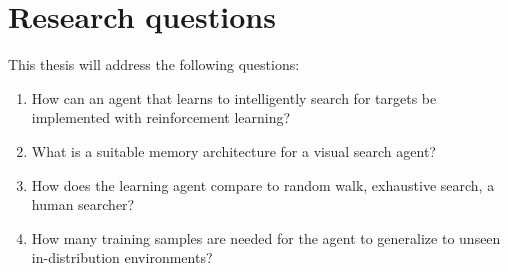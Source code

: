 \section{Research questions}
\label{sec:research-questions}

% 
% 
% 
% 
% 
% 
% 
% 

This thesis will address the following questions:

\begin{enumerate}
  \item \label{itm:rq1} How can an agent that learns to intelligently search for targets be implemented with reinforcement learning?
  \item What is a suitable memory architecture for a visual search agent?
  \item \label{itm:rq2} How does the learning agent compare to random walk, exhaustive search, a human searcher?
  \item \label{itm:rq3} How many training samples are needed for the agent to generalize to unseen in-distribution environments?
\end{enumerate}

